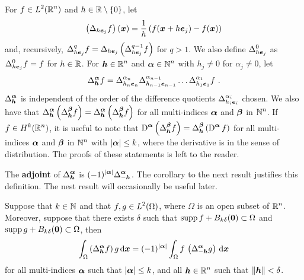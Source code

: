 For $\displaystyle f\in L^2(\mathbb{R}^n)$ and $h \in \mathbb{R}\setminus \{0\}$, let
\begin{equation}  \label{ell_diffQuot}
\left(\Delta_{h{\bm{e}}_j} f\right)({\bm{x}}) =
\frac{1}{h} \left( f({\bm{x}} + h{\bm{e}}_j) -f({\bm{x}}) \right)
\end{equation}
and, recursively,
$\displaystyle \Delta_{h{\bm{e}}_j}^q f =
\Delta_{h{\bm{e}}_j} \left(\Delta_{h{\bm{e}}_j}^{q-1} f \right)$
for $q>1$.
We also define $\displaystyle \Delta^0_{h{\bm{e}}_j}$ as
$\displaystyle \Delta^0_{h{\bm{e}}_j} f = f$ for $h \in \mathbb{R}$.
For $\displaystyle {\bm{h}} \in \mathbb{R}^n$ and
$\displaystyle {\bm{\alpha}} \in \mathbb{N}^n$ with $h_j \neq 0$ for
$\alpha_j \neq 0$, let
\[
\Delta_{{\bm{h}}}^{{\bm{\alpha}}} f = \Delta_{h_n{\bm{e}}_n}^{\alpha_n} 
\Delta_{h_{n-1}{\bm{e}}_{n-1}}^{\alpha_{n-1}} \ldots
\Delta_{h_1{\bm{e}}_1}^{\alpha_1} f \ .
\]
$\displaystyle \Delta_{{\bm{h}}}^{{\bm{\alpha}}}$ is independent of the
order of the difference quotients
$\displaystyle \Delta_{h_i{\bm{e}}_i}^{\alpha_i}$ chosen.
We also have that
$\displaystyle \Delta_{{\bm{h}}}^{{\bm{\alpha}}}
\left( \Delta_{{\bm{h}}}^{{\bm{\beta}}} f\right)
= \Delta_{{\bm{h}}}^{{\bm{\alpha}}} \left( \Delta_{{\bm{h}}}^{{\bm{\beta}}} f\right)$
for all multi-indices ${\bm{\alpha}}$ and ${\bm{\beta}}$ in $\displaystyle \mathbb{N}^n$.
If $\displaystyle f \in H^k(\mathbb{R}^n)$, it is useful to note that
$\displaystyle \operatorname{D}^{{\bm{\alpha}}}\left( \Delta_{{\bm{h}}}^{{\bm{\beta}}} f \right)
= \Delta_{{\bm{h}}}^{{\bm{\beta}}} \left(\operatorname{D}^{{\bm{\alpha}}} f \right)$ for all
multi-indices ${\bm{\alpha}}$ and ${\bm{\beta}}$ in $\displaystyle \mathbb{N}^n$ with
$|{\bm{\alpha}}|\leq k$, where the
derivative is in the sense of distribution.  The proofs of these
statements is left to the reader.

The {\bfseries adjoint} of $\displaystyle \Delta_{{\bm{h}}}^{{\bm{\alpha}}}$ is
$\displaystyle (-1)^{|{\bm{\alpha}}|}\Delta_{-{\bm{h}}}^{{\bm{\alpha}}}$.  The
corollary to the next result justifies this definition.  The nest
result will occasionally be useful later.

\begin{prop} \label{DiffQuotientAdjoint}
Suppose that $k \in \mathbb{N}$ and that $\displaystyle f,g \in L^2(\Omega)$,
where $\Omega$ is an open subset of $\displaystyle \mathbb{R}^n$.  Moreover,
suppose that there exists $\delta$ such that
$\operatorname{supp} f + B_{k\delta}({\bm{0}}) \subset \Omega$ and
$\operatorname{supp} g + B_{k\delta}({\bm{0}}) \subset \Omega$, then
\[
\int_{\Omega} \left(\Delta^{{\bm{\alpha}}}_{{\bm{h}}} f\right) g \,\mathrm{d}{{\bm{x}}}
= (-1)^{|{\bm{\alpha}}|}
\int_{\Omega} f\,\left(\Delta^{{\bm{\alpha}}}_{-{\bm{h}}} g\right) \,\mathrm{d}{{\bm{x}}}
\]
for all multi-indices ${\bm{\alpha}}$ such that $|{\bm{\alpha}}|\leq k$, and all
$\displaystyle {\bm{h}} \in \mathbb{R}^n$ such that $\|{\bm{h}}\|<\delta$.
\end{prop}

